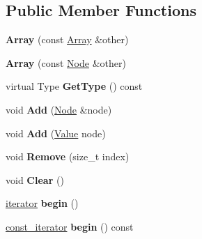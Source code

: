 \subsection*{Public Member Functions}
\begin{DoxyCompactItemize}
\item 
\hypertarget{class_jzon_1_1_array_a289a79745f42c02471ca110bc1c603c0}{{\bfseries Array} (const \hyperlink{class_jzon_1_1_array}{Array} \&other)}\label{class_jzon_1_1_array_a289a79745f42c02471ca110bc1c603c0}

\item 
\hypertarget{class_jzon_1_1_array_a438386adb96885f30bdf7f7b223f4d79}{{\bfseries Array} (const \hyperlink{class_jzon_1_1_node}{Node} \&other)}\label{class_jzon_1_1_array_a438386adb96885f30bdf7f7b223f4d79}

\item 
\hypertarget{class_jzon_1_1_array_a4df32821b19e69448ac1f31c6278be86}{virtual Type {\bfseries Get\-Type} () const }\label{class_jzon_1_1_array_a4df32821b19e69448ac1f31c6278be86}

\item 
\hypertarget{class_jzon_1_1_array_afe136f358fe0c92269bd6b045b5dc0bc}{void {\bfseries Add} (\hyperlink{class_jzon_1_1_node}{Node} \&node)}\label{class_jzon_1_1_array_afe136f358fe0c92269bd6b045b5dc0bc}

\item 
\hypertarget{class_jzon_1_1_array_a74c5be6b360ac616631ee54f9fc47c5e}{void {\bfseries Add} (\hyperlink{class_jzon_1_1_value}{Value} node)}\label{class_jzon_1_1_array_a74c5be6b360ac616631ee54f9fc47c5e}

\item 
\hypertarget{class_jzon_1_1_array_a1fe329de43ce5ce2a9fcc8c496a2c846}{void {\bfseries Remove} (size\-\_\-t index)}\label{class_jzon_1_1_array_a1fe329de43ce5ce2a9fcc8c496a2c846}

\item 
\hypertarget{class_jzon_1_1_array_af820365490b6774d1101fc1c865fdf19}{void {\bfseries Clear} ()}\label{class_jzon_1_1_array_af820365490b6774d1101fc1c865fdf19}

\item 
\hypertarget{class_jzon_1_1_array_a4842e90116caf7d4babc81b98dcfde9c}{\hyperlink{class_jzon_1_1_array_1_1iterator}{iterator} {\bfseries begin} ()}\label{class_jzon_1_1_array_a4842e90116caf7d4babc81b98dcfde9c}

\item 
\hypertarget{class_jzon_1_1_array_ad7bccf34ce7436f396b5d714dc09c334}{\hyperlink{class_jzon_1_1_array_1_1const__iterator}{const\-\_\-iterator} {\bfseries begin} () const }\label{class_jzon_1_1_array_ad7bccf34ce7436f396b5d714dc09c334}


\end{DoxyCompactItemize}
